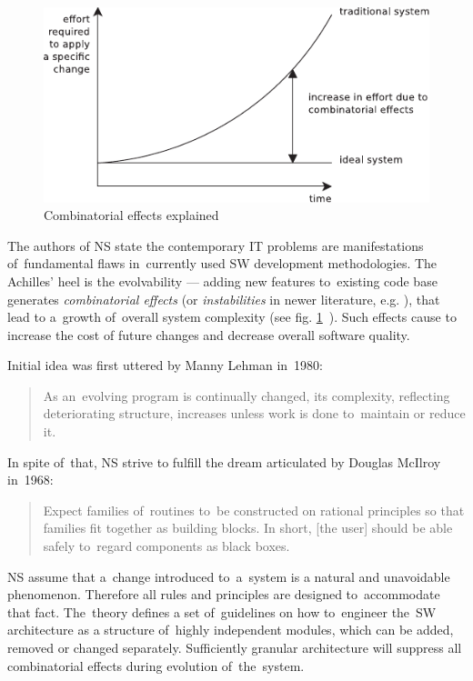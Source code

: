 \documentclass[thesis=M,english,hidelinks]{FITthesis}[2012/10/20]
\begin{document}
\begin{figure}[t]
  \centering
    \includegraphics{images/Combinatorial_effects_explained.pdf}
   	\caption{Combinatorial effects explained}
    \label{fig:combinatorial_effects}
\end{figure}

The authors of \acrlong{NS} state the contemporary \acrshort{IT} problems are manifestations of~fundamental flaws in~currently used \acrshort{SW} development methodologies. The Achilles' heel is the evolvability --- adding new features to~existing code base generates \emph{combinatorial effects} (or \textit{instabilities} in newer literature, e.g. \cite{ns-toward-general-theory}), that lead to a~growth of~overall system complexity (see fig. \ref{fig:combinatorial_effects}~\cite{ns-recreating}). Such effects cause to increase the cost of future changes and decrease overall software quality.\cite{ns-recreating}

Initial idea was first uttered by Manny Lehman in~1980:
\begin{quote}
    As an~evolving program is continually changed, its complexity, reflecting deteriorating structure, increases unless work is done to~maintain or reduce it.~\cite{lehman-1980-programs}
\end{quote}

In spite of~that, \acrlong{NS} strive to fulfill the dream articulated by Douglas McIlroy in~1968:
\begin{quote}
    Expect families of~routines to~be constructed on rational principles so that families fit together as building blocks. In short, [the user] should be able safely to~regard components as black boxes.~\cite{mcilroy-1968-mass-software}
\end{quote}

\acrshort{NS} assume that a~change introduced to~a~system is a natural and unavoidable phenomenon. Therefore all rules and principles are designed to~accommodate that fact. The~theory defines a set of~guidelines on how to~engineer the~\acrlong{SW} architecture as a structure of~highly independent modules, which can be added, removed or changed separately. Sufficiently granular architecture will suppress all combinatorial effects during evolution of~the~system.
\end{document}
